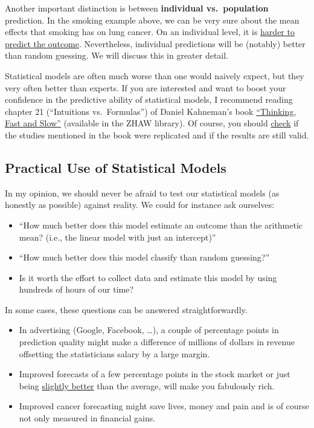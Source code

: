 \documentclass[
]{book}
\begin{document}
Another important distinction is between \textbf{individual vs.~population} prediction.
In the smoking example above, we can be very sure about the mean effects that smoking has on lung cancer.
On an individual level, it is \href{https://www.liebertpub.com/doi/10.1089/rej.2019.2298}{harder to predict the outcome}.
Nevertheless, individual predictions will be (notably) better than random guessing. We will discuss this in greater detail.

Statistical models are often much worse than one would naively expect, but
they very often better than experts. If you are interested and want to
boost your confidence in the predictive ability of statistical models,
I recommend reading chapter 21 (``Intuitions vs.~Formulas'') of Daniel Kahneman's book
\href{https://en.wikipedia.org/wiki/Thinking,_Fast_and_Slow}{``Thinking, Fast and Slow''}
(available in the ZHAW library). Of course, you should
\href{https://replicationindex.com/2020/12/30/a-meta-scientific-perspective-on-thinking-fast-and-slow/}{check} if the studies
mentioned in the book were replicated and if the results are still valid.

\subsection{Practical Use of Statistical Models}\label{practical-use-of-statistical-models}

In my opinion, we should never be afraid to test our statistical models (as honestly as possible) against reality.
We could for instance ask ourselves:

\begin{itemize}
\item
  ``How much better does this model estimate an outcome than the arithmetic mean?
  (i.e., the linear model with just an intercept)''
\item
  ``How much better does this model classify than random guessing?''
\item
  Is it worth the effort to collect data and estimate this model by using hundreds of hours of our time?
\end{itemize}

In some cases, these questions can be answered straightforwardly.

\begin{itemize}
\item
  In advertising (Google, Facebook, \ldots), a couple of percentage points in prediction quality might make a difference of millions
  of dollars in revenue offsetting the statisticians salary by a large margin.
\item
  Improved forecasts of a few percentage points in the stock market or just being \href{https://en.wikipedia.org/wiki/Jim_Simons}{slightly better}
  than the average, will make you fabulously rich.
\item
  Improved cancer forecasting might save lives, money and pain and is of course
  not only measured in financial gains.
\end{itemize}
\end{document}

